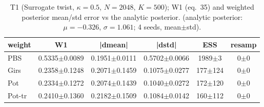 \begin{table}[ht]
\centering
\caption{T1 (Surrogate twist, $\kappa=0.5$, $N=2048$, $K=500$); W1 (eq.~35) and weighted posterior mean/std error vs the analytic posterior. (analytic posterior: $\mu=-0.326$, $\sigma=1.061$; 4 seeds, mean$\pm$std).}
\label{tab:toy_t1_surrogate}
\begin{tabular}{lccccc}
\toprule
weight & W1 & |dmean| & |dstd| & ESS & resamp \\
\midrule
PBS & 0.5335$\pm$0.0089 & 0.1951$\pm$0.0111 & 0.5702$\pm$0.0066 & 1989$\pm$3 & 0$\pm$0 \\
Girs & 0.2358$\pm$0.1248 & 0.2071$\pm$0.1459 & 0.1075$\pm$0.0277 & 177$\pm$124 & 0$\pm$0 \\
Pot & 0.2334$\pm$0.1272 & 0.2074$\pm$0.1439 & 0.1040$\pm$0.0272 & 172$\pm$120 & 0$\pm$0 \\
Pot-tr & 0.2410$\pm$0.1360 & 0.2182$\pm$0.1509 & 0.1084$\pm$0.0142 & 160$\pm$112 & 0$\pm$0 \\
\bottomrule
\end{tabular}
\end{table}

